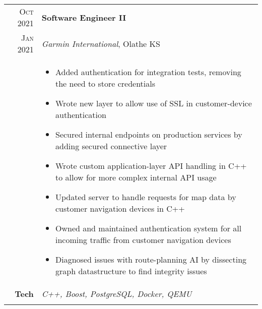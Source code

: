 \documentclass[a4paper,10pt]{article}
\newcommand{\br}{\\\multicolumn{2}{c}{}}
\begin{document}
\begin{tabular}{r|p{15cm}}
  \textsc{Oct 2021}  & \textbf{Software Engineer II} \\
  \textsc{Jan 2021}  & \textit{Garmin International}, Olathe KS
  \\ &
       \begin{itemize}
       \item Added authentication for integration tests, removing the need to store credentials
       \item Wrote new layer to allow use of SSL in customer-device authentication
       \item Secured internal endpoints on production services by adding secured connective layer
       \item Wrote custom application-layer API handling in C++ to allow for more complex internal API usage
       \item Updated server to handle requests for map data by customer navigation devices in C++
       \item Owned and maintained authentication system for all incoming traffic from customer navigation devices
       \item Diagnosed issues with route-planning AI by dissecting graph datastructure to find integrity issues
       \end{itemize} \\
  \textbf{Tech} & \textit{C++, Boost, PostgreSQL, Docker, QEMU} \br \\
\end{tabular}
\end{document}

